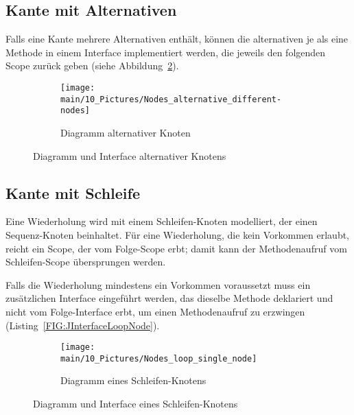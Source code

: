\documentclass[../InterneDSLs.tex]{subfiles}
\begin{document}
\subsection{Kante mit Alternativen}
Falls eine Kante mehrere Alternativen enthält, können die alternativen je als eine Methode in einem Interface implementiert werden, die jeweils den folgenden Scope zurück geben (siehe Abbildung~\ref{FIG:AlternativeNode}).
\begin{figure}[ht]
\centering
  \begin{subfigure}[c]{0.49\textwidth}
    \texttt{[image: \\main/10\_Pictures/Nodes\_alternative\_different-nodes]}
    \caption{Diagramm alternativer Knoten}
    \label{FIG:DiagramAlternativeNode}
  \end{subfigure}
  \begin{subfigure}[c]{0.49\textwidth}
    
  \end{subfigure}
  \caption{Diagramm und Interface alternativer Knotens}
  \label{FIG:AlternativeNode}
\end{figure}

\subsection{Kante mit Schleife}
Eine Wiederholung wird mit einem Schleifen-Knoten modelliert, der einen Sequenz-Knoten beinhaltet. Für eine Wiederholung, die kein Vorkommen erlaubt, reicht ein Scope, der vom Folge-Scope erbt; damit kann der Methodenaufruf vom Schleifen-Scope übersprungen werden.

Falls die Wiederholung mindestens ein Vorkommen voraussetzt muss ein zusätzlichen Interface eingeführt werden, das dieselbe Methode deklariert und nicht vom Folge-Interface erbt, um einen Methodenaufruf zu erzwingen (Listing~\ref{FIG:JInterfaceLoopNode}).
\begin{figure}[ht]
\centering
  \begin{subfigure}[c]{0.49\textwidth}
    \texttt{[image: \\main/10\_Pictures/Nodes\_loop\_single\_node]}
    \caption{Diagramm eines Schleifen-Knotens}
    \label{FIG:DiagramLoopNode}
  \end{subfigure}
  \begin{subfigure}[c]{0.49\textwidth}
    
  \end{subfigure}
  \caption{Diagramm und Interface eines Schleifen-Knotens}
  \label{FIG:LoopNode}
\end{figure}
\end{document}
